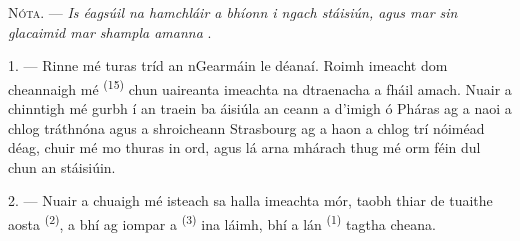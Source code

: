 %
%

\VUsaut{4.0mm}
\VUsaut{2.4mm}
\VUsaut{3.4mm}
\textsc{Nóta.} --- \textit{Is éagsúil na hamchláir a bhíonn i ngach stáisiún, agus
mar sin glacaimid mar shampla amanna} .

1. --- Rinne mé turas tríd an nGearmáin le déanaí. Roimh imeacht dom cheannaigh mé
 \textsuperscript{(15)} chun uaireanta imeachta na dtraenacha a
fháil amach. Nuair a chinntigh mé gurbh í an traein ba áisiúla an ceann a d'imigh ó
Pháras ag a naoi a chlog tráthnóna agus a shroicheann Strasbourg ag a haon a chlog
trí nóiméad déag, chuir mé mo thuras in ord, agus lá arna mhárach thug mé orm féin
dul chun an stáisiúin.

2. --- Nuair a chuaigh mé isteach sa halla imeachta mór, taobh thiar de
 tuaithe aosta \textsuperscript{(2)}, a bhí ag iompar a  \textsuperscript{(3)} ina láimh, bhí a lán 
\textsuperscript{(1)} tagtha cheana.

